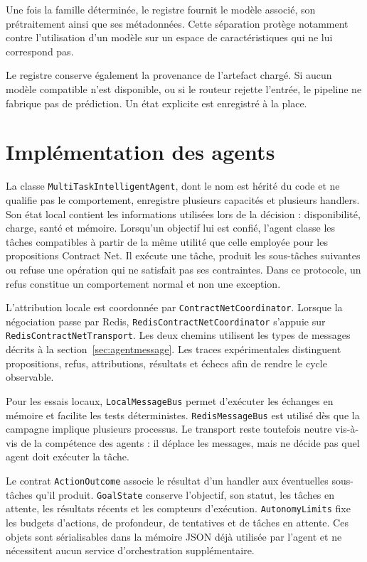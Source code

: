 Une fois la famille déterminée, le registre fournit le modèle associé, son prétraitement ainsi que ses métadonnées. Cette séparation protège notamment contre l'utilisation d'un modèle sur un espace de caractéristiques qui ne lui correspond pas.

Le registre conserve également la provenance de l'artefact chargé. Si aucun modèle compatible n'est disponible, ou si le routeur rejette l'entrée, le pipeline ne fabrique pas de prédiction. Un état explicite est enregistré à la place.


\section{Implémentation des agents}

La classe \texttt{MultiTaskIntelligentAgent}, dont le nom est hérité du code et ne qualifie pas le comportement, enregistre plusieurs capacités et plusieurs handlers. Son état local contient les informations utilisées lors de la décision : disponibilité, charge, santé et mémoire. Lorsqu'un objectif lui est confié, l'agent classe les tâches compatibles à partir de la même utilité que celle employée pour les propositions Contract Net. Il exécute une tâche, produit les sous-tâches suivantes ou refuse une opération qui ne satisfait pas ses contraintes. Dans ce protocole, un refus constitue un comportement normal et non une exception.

L'attribution locale est coordonnée par \texttt{ContractNetCoordinator}. Lorsque la négociation passe par Redis, \texttt{RedisContractNetCoordinator} s'appuie sur \texttt{RedisContractNetTransport}. Les deux chemins utilisent les types de messages décrits à la section~\ref{sec:agentmessage}. Les traces expérimentales distinguent propositions, refus, attributions, résultats et échecs afin de rendre le cycle observable.

Pour les essais locaux, \texttt{LocalMessageBus} permet d'exécuter les échanges en mémoire et facilite les tests déterministes. \texttt{RedisMessageBus} est utilisé dès que la campagne implique plusieurs processus. Le transport reste toutefois neutre vis-à-vis de la compétence des agents : il déplace les messages, mais ne décide pas quel agent doit exécuter la tâche.

Le contrat \texttt{ActionOutcome} associe le résultat d'un handler aux éventuelles sous-tâches qu'il produit. \texttt{GoalState} conserve l'objectif, son statut, les tâches en attente, les résultats récents et les compteurs d'exécution. \texttt{AutonomyLimits} fixe les budgets d'actions, de profondeur, de tentatives et de tâches en attente. Ces objets sont sérialisables dans la mémoire JSON déjà utilisée par l'agent et ne nécessitent aucun service d'orchestration supplémentaire.

